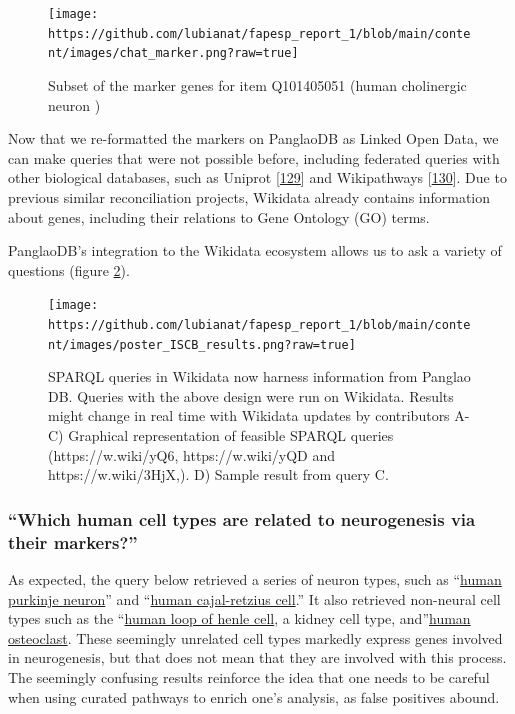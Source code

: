 \begin{figure}
\hypertarget{fig:chat_marker}{%
\centering
\texttt{[image: https://github.com/lubianat/fapesp\_report\_1/blob/main/content/images/chat\_marker.png?raw=true]}
\caption{Subset of the marker genes for item Q101405051 (human cholinergic neuron )}\label{fig:chat_marker}
}
\end{figure}

Now that we re-formatted the markers on PanglaoDB as Linked Open Data, we can make queries that were not possible before, including
federated queries with other biological databases, such as Uniprot {[}\protect\hyperlink{ref-HUJ9NzAb}{129}{]}
and Wikipathways {[}\protect\hyperlink{ref-AgOOCR24}{130}{]}.
Due to previous similar reconciliation projects, Wikidata already contains information about genes, including their relations to Gene Ontology (GO) terms.

PanglaoDB's integration to the Wikidata ecosystem allows us to ask a variety of questions (figure \ref{fig:iscb_results}).

\begin{figure}
\hypertarget{fig:iscb_results}{%
\centering
\texttt{[image: https://github.com/lubianat/fapesp\_report\_1/blob/main/content/images/poster\_ISCB\_results.png?raw=true]}
\caption{SPARQL queries in Wikidata now harness information from Panglao DB. Queries with the above design were run on Wikidata. Results might change in real time with Wikidata updates by contributors A-C) Graphical representation of feasible SPARQL queries (https://w.wiki/yQ6, https://w.wiki/yQD and https://w.wiki/3HjX,). D) Sample result from query C.}\label{fig:iscb_results}
}
\end{figure}

\hypertarget{which-human-cell-types-are-related-to-neurogenesis-via-their-markers}{%
\subsubsection{``Which human cell types are related to neurogenesis via their markers?''}\label{which-human-cell-types-are-related-to-neurogenesis-via-their-markers}}

As expected, the query below retrieved a series of neuron types, such as ``\href{https://www.wikidata.org/wiki/Q101404913}{human purkinje neuron}'' and ``\href{https://www.wikidata.org/wiki/Q101405091}{human cajal-retzius cell}.'' It also retrieved non-neural cell types such as the ``\href{https://www.wikidata.org/wiki/Q101405109}{human loop of henle cell}, a kidney cell type, and''\href{https://www.wikidata.org/wiki/Q101404928}{human osteoclast}. These seemingly unrelated cell types markedly express genes involved in neurogenesis, but that does not mean that they are involved with this process. The seemingly confusing results reinforce the idea that one needs to be careful when using curated pathways to enrich one's analysis, as false positives abound.

